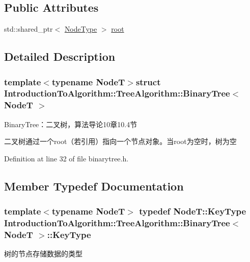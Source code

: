 \subsection*{Public Attributes}
\begin{DoxyCompactItemize}
\item 
std\+::shared\+\_\+ptr$<$ \hyperlink{struct_introduction_to_algorithm_1_1_tree_algorithm_1_1_binary_tree_a9a441f3f41c5b69758204ba60fe02010}{Node\+Type} $>$ \hyperlink{struct_introduction_to_algorithm_1_1_tree_algorithm_1_1_binary_tree_aa0d43af70ef50ff59740dced2e832074}{root}
\end{DoxyCompactItemize}


\subsection{Detailed Description}
\subsubsection*{template$<$typename Node\+T$>$struct Introduction\+To\+Algorithm\+::\+Tree\+Algorithm\+::\+Binary\+Tree$<$ Node\+T $>$}

Binary\+Tree：二叉树，算法导论10章10.4节 

二叉树通过一个root（若引用）指向一个节点对象。当root为空时，树为空 

Definition at line 32 of file binarytree.\+h.



\subsection{Member Typedef Documentation}
\hypertarget{struct_introduction_to_algorithm_1_1_tree_algorithm_1_1_binary_tree_af231d881ec1d08492b2b5b5638e5e373}{}
\subsubsection[{Key\+Type}]{\setlength{\rightskip}{0pt plus 5cm}template$<$typename Node\+T$>$ typedef Node\+T\+::\+Key\+Type {\bf Introduction\+To\+Algorithm\+::\+Tree\+Algorithm\+::\+Binary\+Tree}$<$ Node\+T $>$\+::{\bf Key\+Type}}\label{struct_introduction_to_algorithm_1_1_tree_algorithm_1_1_binary_tree_af231d881ec1d08492b2b5b5638e5e373}
树的节点存储数据的类型 

